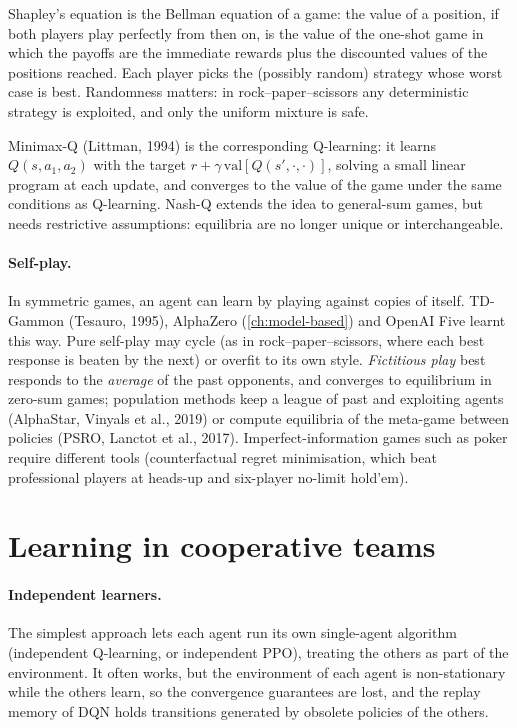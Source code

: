 \begin{intuition}
  Shapley's equation is the Bellman equation of a game: the value of a
  position, if both players play perfectly from then on, is the value of
  the one-shot game in which the payoffs are the immediate rewards plus the
  discounted values of the positions reached. Each player picks the
  (possibly random) strategy whose worst case is best. Randomness matters:
  in rock--paper--scissors any deterministic strategy is exploited, and
  only the uniform mixture is safe.
\end{intuition}

Minimax-Q (Littman, 1994) is the corresponding Q-learning: it learns
$Q(s, a_1, a_2)$ with the target $r + \gamma\, \mathrm{val}[Q(s', \cdot,
\cdot)]$, solving a small linear program at each update, and converges to
the value of the game under the same conditions as Q-learning. Nash-Q
extends the idea to general-sum games, but needs restrictive assumptions:
equilibria are no longer unique or interchangeable.

\paragraph{Self-play.} In symmetric games, an agent can learn by playing
against copies of itself. TD-Gammon (Tesauro, 1995), AlphaZero
(\cref{ch:model-based}) and OpenAI Five learnt this way. Pure self-play
may cycle (as in rock--paper--scissors, where each best response is beaten
by the next) or overfit to its own style. \emph{Fictitious play} best
responds to the \emph{average} of the past opponents, and converges to
equilibrium in zero-sum games; population methods keep a league of past
and exploiting agents (AlphaStar, Vinyals et al., 2019) or compute
equilibria of the meta-game between policies (PSRO, Lanctot et al.,
2017). Imperfect-information games such as poker require different tools
(counterfactual regret minimisation, which beat professional players at
heads-up and six-player no-limit hold'em).

\section{Learning in cooperative teams}

\paragraph{Independent learners.} The simplest approach lets each agent run
its own single-agent algorithm (independent Q-learning, or independent PPO),
treating the others as part of the environment. It often works, but the
environment of each agent is non-stationary while the others learn, so the
convergence guarantees are lost, and the replay memory of DQN holds
transitions generated by obsolete policies of the others.

